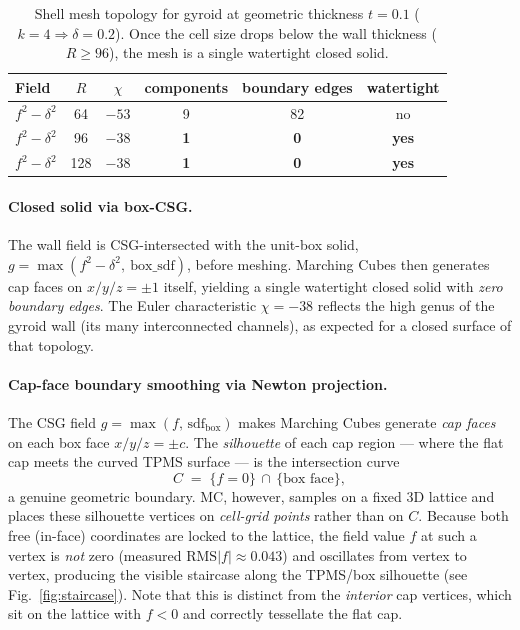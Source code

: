 \documentclass[11pt]{article}
\begin{document}
\begin{table}[h]
\centering
\caption{Shell mesh topology for gyroid at geometric thickness
$t=0.1$ ($k=4 \Rightarrow \delta=0.2$).  Once the cell size drops
below the wall thickness ($R\ge 96$), the mesh is a single watertight
closed solid.}
\label{tab:shell-fragments}
\begin{tabular}{lccccc}
\toprule
Field & $R$ & $\chi$ & components & boundary edges & watertight \\
\midrule
$f^2-\delta^2$ & 64  & $-53$ & 9 & 82 & no  \\
$f^2-\delta^2$ & 96  & $-38$ & \textbf{1} & \textbf{0} & \textbf{yes} \\
$f^2-\delta^2$ & 128 & $-38$ & \textbf{1} & \textbf{0} & \textbf{yes} \\
\bottomrule
\end{tabular}
\end{table}

\paragraph{Closed solid via box-CSG.}
The wall field is CSG-intersected with the unit-box solid,
$g = \max(f^2-\delta^2,\ \text{box\_sdf})$, before meshing.  Marching
Cubes then generates cap faces on $x/y/z = \pm 1$ itself, yielding a
single watertight closed solid with \emph{zero boundary edges}.  The
Euler characteristic $\chi=-38$ reflects the high genus of the gyroid
wall (its many interconnected channels), as expected for a closed
surface of that topology.

\paragraph{Cap-face boundary smoothing via Newton projection.}
\label{sec:snap-boundary}
The CSG field $g = \max(f,\,\mathrm{sdf}_{\text{box}})$ makes Marching
Cubes generate \emph{cap faces} on each box face $x/y/z = \pm c$.  The
\emph{silhouette} of each cap region --- where the flat cap meets the
curved TPMS surface --- is the intersection curve
\begin{equation}
  C \;=\; \{f = 0\} \,\cap\, \{\text{box face}\},
\end{equation}
a genuine geometric boundary.  MC, however, samples on a fixed 3D
lattice and places these silhouette vertices on \emph{cell-grid
points} rather than on $C$.  Because both free (in-face) coordinates
are locked to the lattice, the field value $f$ at such a vertex is
\emph{not} zero (measured $\mathrm{RMS}|f|\approx 0.043$) and
oscillates from vertex to vertex, producing the visible staircase
along the TPMS/box silhouette (see Fig.~\ref{fig:staircase}).  Note
that this is distinct from the \emph{interior} cap vertices, which sit
on the lattice with $f<0$ and correctly tessellate the flat cap.
\end{document}

